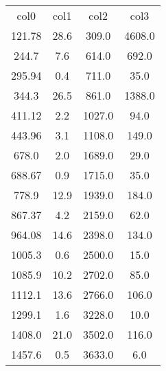 \begin{table}
\begin{tabular}{cccc}
col0 & col1 & col2 & col3 \\
121.78 & 28.6 & 309.0 & 4608.0 \\
244.7 & 7.6 & 614.0 & 692.0 \\
295.94 & 0.4 & 711.0 & 35.0 \\
344.3 & 26.5 & 861.0 & 1388.0 \\
411.12 & 2.2 & 1027.0 & 94.0 \\
443.96 & 3.1 & 1108.0 & 149.0 \\
678.0 & 2.0 & 1689.0 & 29.0 \\
688.67 & 0.9 & 1715.0 & 35.0 \\
778.9 & 12.9 & 1939.0 & 184.0 \\
867.37 & 4.2 & 2159.0 & 62.0 \\
964.08 & 14.6 & 2398.0 & 134.0 \\
1005.3 & 0.6 & 2500.0 & 15.0 \\
1085.9 & 10.2 & 2702.0 & 85.0 \\
1112.1 & 13.6 & 2766.0 & 106.0 \\
1299.1 & 1.6 & 3228.0 & 10.0 \\
1408.0 & 21.0 & 3502.0 & 116.0 \\
1457.6 & 0.5 & 3633.0 & 6.0 \\
\end{tabular}
\end{table}

